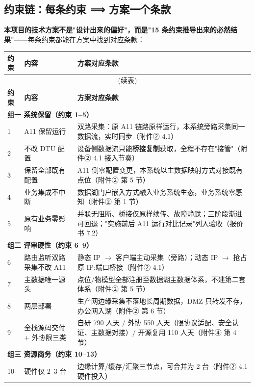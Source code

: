 \documentclass[11pt,a4paper]{ctexart}
\begin{document}
\subsection{约束链：每条约束 ⟹ 方案一个条款}

\textbf{本项目的技术方案不是"设计出来的偏好"，而是"15 条约束推导出来的必然结果"}——每条约束都能在方案中找到对应条款：

\begin{longtable}{p{1.2cm} p{4.8cm} p{7.8cm}}
\toprule
\textbf{约束} & \textbf{内容} & \textbf{方案对应条款} \\
\midrule
\endfirsthead
\multicolumn{3}{c}{(续表)} \\
\toprule
\textbf{约束} & \textbf{内容} & \textbf{方案对应条款} \\
\midrule
\endhead

\multicolumn{3}{l}{\textbf{组一 系统保留（约束 1--5）}} \\
1 & A11 保留运行 & 双路采集：原 A11 链路原样运行，本系统旁路采集同一数据流，实时同步（附件② 4.1） \\
2 & 不改 DTU 配置 & 设备侧数据流只能\textbf{桥接复制}获取，全程不存在"接管"（附件② 4.1 接入节奏） \\
3 & 保留全部既有配置 & A11 侧零配置变更，本系统以主数据映射方式对接既有点位（附件② 第 5 节） \\
4 & 业务集成不中断 & 数据湖门户嵌入方式融入业务系统生态，业务系统零感知（附件② 第 1 节） \\
5 & 原有业务零影响 & 并联无阻断、桥接仅原样续传、故障静默；三阶段渐进可回退；"实施前后 A11 运行对比记录"列入验收（报价书 7.2） \\
\midrule
\multicolumn{3}{l}{\textbf{组二 评审硬性（约束 6--9）}} \\
6 & 路由监听双路采集不改 A11 & 静态 IP $\rightarrow$ 客户端主动采集（旁路）；动态 IP $\rightarrow$ 抢占原 IP:端口桥接（附件② 4.1） \\
7 & 主数据唯一源头 & 点位/物模型全部注册至数据湖主数据体系，不建第二套体系（附件② 第 5 节） \\
8 & 两层部署 & 生产网边缘采集不落地长周期数据，DMZ 只转发不存，办公网入湖（附件② 第 6 节） \\
9 & 全栈源码交付 + 外协限三类 & 自研 790 人天 / 外协 550 人天（限协议适配、安全认证、主数据对接）/ 开源复用 110 人天（附件④ 第 4 节） \\
\midrule
\multicolumn{3}{l}{\textbf{组三 资源商务（约束 10--13）}} \\
10 & 硬件仅 2--3 台 & 边缘计算/缓存/汇聚三节点，可合并为 2 台（附件② 4.1 硬件投入） \\

\end{longtable}
\end{document}
